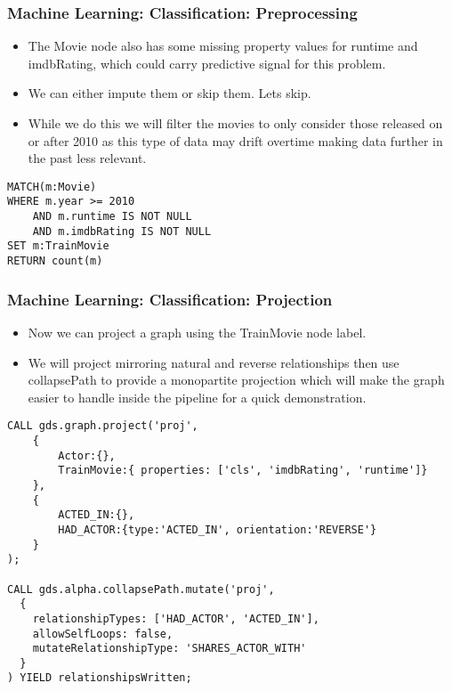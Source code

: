 \begin{frame}[fragile]\frametitle{Machine Learning: Classification: Preprocessing}

\begin{itemize}
\item The Movie node also has some missing property values for runtime and imdbRating, which could carry predictive signal for this problem.
\item We can either impute them or skip them. Lets skip.
\item While we do this we will filter the movies to only consider those released on or after 2010 as this type of data may drift overtime making data further in the past less relevant.
\end{itemize}

\begin{lstlisting}
MATCH(m:Movie)
WHERE m.year >= 2010
    AND m.runtime IS NOT NULL
    AND m.imdbRating IS NOT NULL
SET m:TrainMovie
RETURN count(m)
\end{lstlisting}
\end{frame}

\begin{frame}[fragile]\frametitle{Machine Learning: Classification: Projection}

\begin{itemize}
\item Now we can project a graph using the TrainMovie node label. 
\item We will project mirroring natural and reverse relationships then use collapsePath to provide a monopartite projection which will make the graph easier to handle inside the pipeline for a quick demonstration.
\end{itemize}

\begin{lstlisting}
CALL gds.graph.project('proj',
    {
        Actor:{},
        TrainMovie:{ properties: ['cls', 'imdbRating', 'runtime']}
    },
    {
        ACTED_IN:{},
        HAD_ACTOR:{type:'ACTED_IN', orientation:'REVERSE'}
    }
);

CALL gds.alpha.collapsePath.mutate('proj',
  {
    relationshipTypes: ['HAD_ACTOR', 'ACTED_IN'],
    allowSelfLoops: false,
    mutateRelationshipType: 'SHARES_ACTOR_WITH'
  }
) YIELD relationshipsWritten;
\end{lstlisting}
\end{frame}

